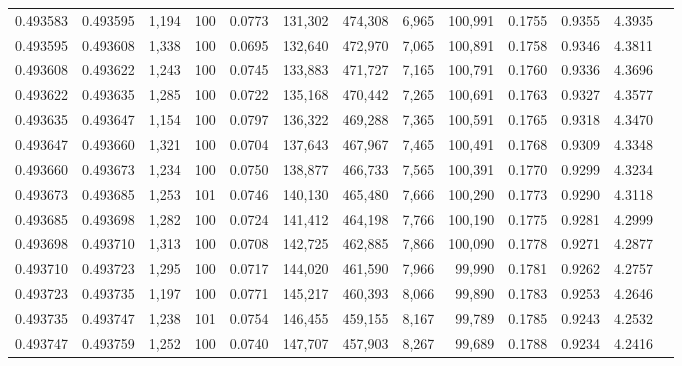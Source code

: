 \begin{tabular}{rrrrrrrrrrrrr}
0.493583 & 0.493595 & 1,194 & 100 &                                     0.0773 & 131,302 & 474,308 &   6,965 & 100,991 & 0.1755 & 0.9355 & 4.3935 \\
0.493595 & 0.493608 & 1,338 & 100 &                                     0.0695 & 132,640 & 472,970 &   7,065 & 100,891 & 0.1758 & 0.9346 & 4.3811 \\
0.493608 & 0.493622 & 1,243 & 100 &                                     0.0745 & 133,883 & 471,727 &   7,165 & 100,791 & 0.1760 & 0.9336 & 4.3696 \\
0.493622 & 0.493635 & 1,285 & 100 &                                     0.0722 & 135,168 & 470,442 &   7,265 & 100,691 & 0.1763 & 0.9327 & 4.3577 \\
0.493635 & 0.493647 & 1,154 & 100 &                                     0.0797 & 136,322 & 469,288 &   7,365 & 100,591 & 0.1765 & 0.9318 & 4.3470 \\
0.493647 & 0.493660 & 1,321 & 100 &                                     0.0704 & 137,643 & 467,967 &   7,465 & 100,491 & 0.1768 & 0.9309 & 4.3348 \\
0.493660 & 0.493673 & 1,234 & 100 &                                     0.0750 & 138,877 & 466,733 &   7,565 & 100,391 & 0.1770 & 0.9299 & 4.3234 \\
0.493673 & 0.493685 & 1,253 & 101 &                                     0.0746 & 140,130 & 465,480 &   7,666 & 100,290 & 0.1773 & 0.9290 & 4.3118 \\
0.493685 & 0.493698 & 1,282 & 100 &                                     0.0724 & 141,412 & 464,198 &   7,766 & 100,190 & 0.1775 & 0.9281 & 4.2999 \\
0.493698 & 0.493710 & 1,313 & 100 &                                     0.0708 & 142,725 & 462,885 &   7,866 & 100,090 & 0.1778 & 0.9271 & 4.2877 \\
0.493710 & 0.493723 & 1,295 & 100 &                                     0.0717 & 144,020 & 461,590 &   7,966 &  99,990 & 0.1781 & 0.9262 & 4.2757 \\
0.493723 & 0.493735 & 1,197 & 100 &                                     0.0771 & 145,217 & 460,393 &   8,066 &  99,890 & 0.1783 & 0.9253 & 4.2646 \\
0.493735 & 0.493747 & 1,238 & 101 &                                     0.0754 & 146,455 & 459,155 &   8,167 &  99,789 & 0.1785 & 0.9243 & 4.2532 \\
0.493747 & 0.493759 & 1,252 & 100 &                                     0.0740 & 147,707 & 457,903 &   8,267 &  99,689 & 0.1788 & 0.9234 & 4.2416 \\

\end{tabular}
